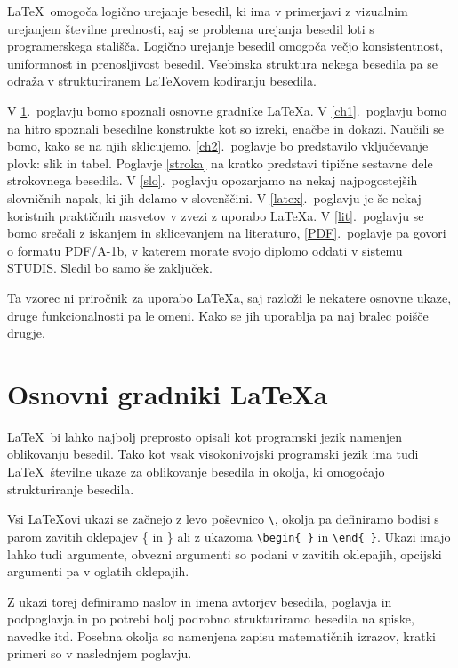 \documentclass[a4paper,12pt,openright]{book}
\begin{document}
\LaTeX\ omogoča logično urejanje besedil, ki ima v primerjavi z vizualnim urejanjem številne prednosti, saj se problema urejanja besedil loti s programerskega stališča.
Logično urejanje besedil omogoča večjo konsistentnost, uniformnost in  prenosljivost besedil.
Vsebinska struktura nekega besedila pa se odraža v strukturiranem \LaTeX ovem kodiranju besedila.

V \ref{ch0}.~poglavju bomo spoznali osnovne gradnike \LaTeX{a}.
V \ref{ch1}.~poglavju bomo na hitro spoznali besedilne konstrukte kot so izreki, enačbe in dokazi.
Naučili se bomo, kako se na njih sklicujemo.
\ref{ch2}.~poglavje bo predstavilo vključevanje plovk: slik in tabel.
Poglavje \ref{stroka} na kratko predstavi tipične sestavne dele strokovnega besedila.
V \ref{slo}.~poglavju opozarjamo na nekaj najpogostejših slovničnih napak, ki jih delamo v slovenščini.
V \ref{latex}.~poglavju je še nekaj koristnih praktičnih nasvetov v zvezi z uporabo \LaTeX{a}.
V \ref{lit}.~poglavju se bomo srečali z iskanjem in sklicevanjem na literaturo,
\ref{PDF}.~poglavje pa govori o formatu PDF/A-1b, v katerem morate svojo diplomo oddati v sistemu STUDIS.
Sledil bo samo še zaključek.

Ta vzorec ni priročnik za uporabo \LaTeX{a}, saj razloži le nekatere osnovne ukaze, druge funkcionalnosti pa le omeni. Kako se jih uporablja
pa naj bralec poišče drugje.


\chapter{Osnovni gradniki \LaTeX{a}}
\label{ch0}

\LaTeX\ bi lahko najbolj preprosto opisali kot programski jezik namenjen oblikovanju besedil.
Tako kot vsak visokonivojski programski jezik ima tudi \LaTeX\  številne ukaze za oblikovanje  besedila in okolja, ki omogočajo strukturiranje besedila.

Vsi \LaTeX ovi ukazi se začnejo z levo poševnico  \verb=\=, okolja pa definiramo bodisi s parom zavitih oklepajev \{ in \} ali z ukazoma \verb=\begin{ }= in   \verb=\end{ }=.
Ukazi imajo lahko tudi argumente, obvezni argumenti so podani v zavitih oklepajih, opcijski argumenti pa v oglatih oklepajih.

Z ukazi torej definiramo naslov in imena avtorjev besedila, poglavja in podpoglavja in po potrebi bolj podrobno strukturiramo besedila na spiske, navedke itd.
Posebna okolja so namenjena zapisu matematičnih izrazov, kratki primeri so v naslednjem poglavju.
\end{document}
